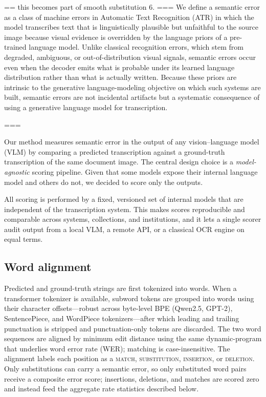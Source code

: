 \documentclass{anthology-ch}         %
\begin{document}
== this becomes part of smooth substitution 6. ===
We define a semantic error as a class of machine errors in Automatic Text Recognition (ATR) in which the model transcribes text that is linguistically plausible but unfaithful to the source image because visual evidence is overridden by the language priors of a pre-trained language model. Unlike classical recognition errors, which stem from degraded, ambiguous, or out-of-distribution visual signals, semantic errors occur even when the decoder emits what is probable under its learned language distribution rather than what is actually written. Because these priors are intrinsic to the generative language-modeling objective on which such systems are built, semantic errors are not incidental artifacts but a systematic consequence of using a generative language model for transcription. 

===

Our method measures semantic error in the output of any vision--language model (VLM) by comparing a predicted transcription against a ground-truth transcription of the same document image. The central design choice is a \emph{model-agnostic} scoring pipeline. Given that some models expose their internal language model and others do not, we decided to score only the outputs. 

All scoring is performed by a fixed, versioned set of internal models that are independent of the transcription system. This makes scores reproducible and comparable across systems, collections, and institutions, and it lets a single scorer audit output from a local VLM, a remote API, or a classical OCR engine on equal terms.

\subsection{Word alignment}

Predicted and ground-truth strings are first tokenized into words. When a
transformer tokenizer is available, subword tokens are grouped into words using
their character offsets---robust across byte-level BPE (Qwen2.5, GPT-2),
SentencePiece, and WordPiece tokenizers---after which leading and trailing
punctuation is stripped and punctuation-only tokens are discarded. The two word
sequences are aligned by minimum edit distance using the same dynamic-program that underlies word error rate (WER); matching is case-insensitive. The
alignment labels each position as a \textsc{match}, \textsc{substitution},
\textsc{insertion}, or \textsc{deletion}. Only substitutions can carry a
semantic error, so only substituted word pairs receive a composite error score;
insertions, deletions, and matches are scored zero and instead feed the
aggregate rate statistics described below.
\end{document}

